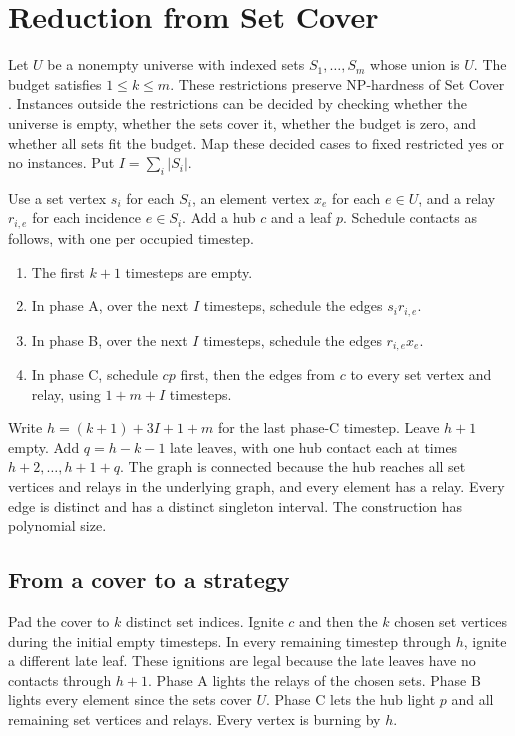 \documentclass[11pt,a4paper]{amsart}
\begin{document}
\section{Reduction from Set Cover}
Let \(U\) be a nonempty universe with indexed sets \(S_1,\ldots,S_m\) whose union is \(U\). The budget satisfies \(1\leq k\leq m\). These restrictions preserve NP-hardness of Set Cover \cite{karp}. Instances outside the restrictions can be decided by checking whether the universe is empty, whether the sets cover it, whether the budget is zero, and whether all sets fit the budget. Map these decided cases to fixed restricted yes or no instances. Put \(I=\sum_i |S_i|\).

Use a set vertex \(s_i\) for each \(S_i\), an element vertex \(x_e\) for each \(e\in U\), and a relay \(r_{i,e}\) for each incidence \(e\in S_i\). Add a hub \(c\) and a leaf \(p\). Schedule contacts as follows, with one per occupied timestep.
\begin{enumerate}
\item The first \(k+1\) timesteps are empty.
\item In phase A, over the next \(I\) timesteps, schedule the edges \(s_i r_{i,e}\).
\item In phase B, over the next \(I\) timesteps, schedule the edges \(r_{i,e}x_e\).
\item In phase C, schedule \(cp\) first, then the edges from \(c\) to every set vertex and relay, using \(1+m+I\) timesteps.
\end{enumerate}
Write \(h=(k+1)+3I+1+m\) for the last phase-C timestep. Leave \(h+1\) empty. Add \(q=h-k-1\) late leaves, with one hub contact each at times \(h+2,\ldots,h+1+q\). The graph is connected because the hub reaches all set vertices and relays in the underlying graph, and every element has a relay. Every edge is distinct and has a distinct singleton interval. The construction has polynomial size.

\subsection*{From a cover to a strategy}
Pad the cover to \(k\) distinct set indices. Ignite \(c\) and then the \(k\) chosen set vertices during the initial empty timesteps. In every remaining timestep through \(h\), ignite a different late leaf. These ignitions are legal because the late leaves have no contacts through \(h+1\). Phase A lights the relays of the chosen sets. Phase B lights every element since the sets cover \(U\). Phase C lets the hub light \(p\) and all remaining set vertices and relays. Every vertex is burning by \(h\).
\end{document}
